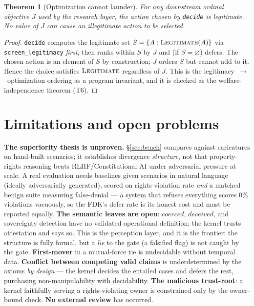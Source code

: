 \documentclass[11pt]{article}
\newtheorem{theorem}{Theorem}
\newcommand{\Legit}{\textsc{Legitimate}}
\begin{document}
\begin{theorem}[Optimization cannot launder]
\label{thm:order}
For any downstream ordinal objective $J$ used by the research layer, the action chosen by
\texttt{decide} is legitimate. No value of $J$ can cause an illegitimate action to be selected.
\end{theorem}
\begin{proof}
\texttt{decide} computes the legitimate set $S=\{A:\Legit(A)\}$ via \texttt{screen\_legitimacy}
\emph{first}, then ranks within $S$ by $J$ and (if $S=\varnothing$) defers. The chosen action
is an element of $S$ by construction; $J$ orders $S$ but cannot add to it. Hence the choice
satisfies $\Legit$ regardless of $J$. This is the legitimacy~$\to$~optimization ordering as a
program invariant, and it is checked as the welfare-independence theorem (T6).
\end{proof}

\section{Limitations and open problems}
\label{sec:limits}

\textbf{The superiority thesis is unproven.} \S\ref{sec:bench} compares against caricatures on
hand-built scenarios; it establishes divergence \emph{structure}, not that property-rights
reasoning beats RLHF/Constitutional AI under adversarial pressure at scale. A real evaluation
needs baselines given scenarios in natural language (ideally adversarially generated), scored
on rights-violation rate \emph{and} a matched benign suite measuring false-denial --- a system
that refuses everything scores $0\%$ violations vacuously, so the FDK's defer rate is its
honest cost and must be reported equally. \textbf{The semantic leaves are open}: $\mathit{coerced}$,
$\mathit{deceived}$, and sovereignty detection have no validated operational definition; the
kernel trusts attestation and says so. This is the perception layer, and it is the frontier:
the structure is fully formal, but a \emph{lie} to the gate (a falsified flag) is not caught
by the gate. \textbf{First-mover} in a mutual-force tie is undecidable without temporal data.
\textbf{Conflict between competing valid claims} is underdetermined by the axioms \emph{by
design} --- the kernel decides the entailed cases and defers the rest, purchasing
non-manipulability with decidability. \textbf{The malicious trust-root}: a kernel faithfully
serving a rights-violating owner is constrained only by the owner-bound check. \textbf{No
external review} has occurred.
\end{document}
